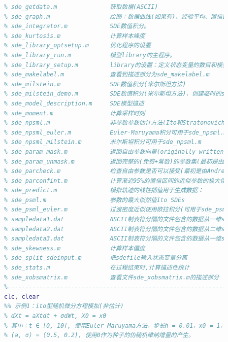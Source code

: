 \begin{lstlisting}[language= Matlab]
        % sde_euler_demo.m            SDE数值积分(欧拉方法)，创建临时的sde_demo.m
        % sde_getdata.m               获取数据(ASCII)
        % sde_graph.m                 绘图：数据曲线(如果有)、经验平均、置信区间、分位数和直方图
        % sde_integrator.m            SDE数值积分。
        % sde_kurtosis.m              计算样本峰度
        % sde_library_optsetup.m      优化程序的设置
        % sde_library_run.m           模型library的主程序。
        % sde_library_setup.m         library的设置：定义状态变量的数目和模型参数
        % sde_makelabel.m             查看到描述部分为sde_makelabel.m
        % sde_milstein.m              SDE数值积分(米尔斯坦方法)
        % sde_milstein_demo.m         SDE数值积分(米尔斯坦方法)，创建临时的sde_demo.m和sde_demo2.m
        % sde_model_description.m     SDE模型描述
        % sde_moment.m                计算采样时刻
        % sde_npsml.m                 非参数参数估计方法(Ito和Stratonovich SDEs)
        % sde_npsml_euler.m           Euler-Maruyama积分可用于sde_npsml.m
        % sde_npsml_milstein.m        米尔斯坦积分可用于sde_npsml.m
        % sde_param_mask.m            返回自由参数向量(originally written by Andrea De Gaetano, www.biomatematica.it)
        % sde_param_unmask.m          返回完整的(免费+常数)的参数集(最初是由Andrea De Gaetano、www.biomatematica。它)
        % sde_parcheck.m              检查自由参数是否可以接受(最初是由Andrea De Gaetano、www.biomatematica。它)
        % sde_parconfint.m            计算渐近95%的置信区间的近似参数的极大似然估计
        % sde_predict.m               模拟轨迹的线性插值用于生成数据：
        % sde_psml.m                  参数的最大似然值Ito SDEs
        % sde_psml_euler.m            过渡密度近似使用欧拉积分(可用于sde_psml。m)
        % sampledata1.dat             ASCII制表符分隔的文件包含的数据从一维sde生成(阅读手册的内容)
        % sampledata2.dat             ASCII制表符分隔的文件包含的数据从二维sde生成(阅读手册的内容)
        % sampledata3.dat             ASCII制表符分隔的文件包含的数据从一维sde生成(阅读手册的内容)
        % sde_skewness.m              计算样本偏度
        % sde_split_sdeinput.m        把sdefile输入状态变量分离
        % sde_stats.m                 在过程结束时,计算描述性统计
        % sde_xobsmatrix.m            查看文件sde_xobsmatrix.m的描述部分
        %---------------------------------------------------------------%
        clc, clear
        %% 示例1：ito型随机微分方程模拟(非估计)
        % dXt = aXtdt + σdWt, X0 = x0
        % 其中：t ∈ [0, 10], 使用Euler-Maruyama方法，步长h = 0.01，x0 = 1，
        % (a, σ) = (0.5, 0.2), 使用0作为种子的伪随机维纳增量的产生。

\end{lstlisting}

